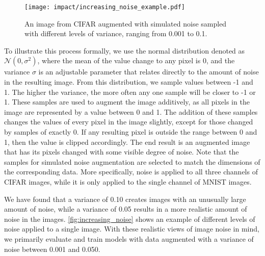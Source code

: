 \documentclass[conference]{IEEEtran}
\begin{document}
\begin{figure}[!b]
    \centering
    \texttt{[image: impact/increasing\_noise\_example.pdf]}
    \captionsetup{width=0.90\columnwidth}
    \caption{An image from CIFAR augmented with simulated noise sampled with different levels of variance, ranging from 0.001 to 0.1.}
    \label{fig:increasing_noise}
\end{figure}

To illustrate this process formally, we use the normal distribution denoted as $\mathcal{N} (0, \sigma^2)$, where the mean of the value change to any pixel is 0, and the variance $\sigma$ is an adjustable parameter that relates directly to the amount of noise in the resulting image. From this distribution, we sample values between -1 and 1. The higher the variance, the more often any one sample will be closer to -1 or 1. These samples are used to augment the image additively, as all pixels in the image are represented by a value between 0 and 1. The addition of these samples changes the values of every pixel in the image slightly, except for those changed by samples of exactly 0. If any resulting pixel is outside the range between 0 and 1, then the value is clipped accordingly. The end result is an augmented image that has its pixels changed with some visible degree of noise. Note that the samples for simulated noise augmentation are selected to match the dimensions of the corresponding data. More specifically, noise is applied to all three channels of CIFAR images, while it is only applied to the single channel of MNIST images.

We have found that a variance of 0.10 creates images with an unusually large amount of noise, while a variance of 0.05 results in a more realistic amount of noise in the images. \autoref{fig:increasing_noise} shows an example of different levels of noise applied to a single image. With these realistic views of image noise in mind, we primarily evaluate and train models with data augmented with a variance of noise between 0.001 and 0.050.
\end{document}
